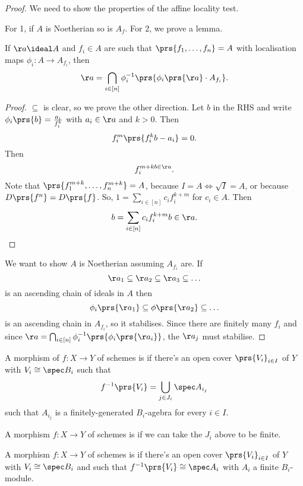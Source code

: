 \documentclass[10pt,a4paper,twoside,openany,hidelinks]{book}
\begin{document}
\begin{proof}
We need to show the properties of the affine locality test.

For 1, if $A$ is Noetherian so is $A_f$.
For 2, we prove a lemma.
\begin{lemma}
If $\aa \ideal A$ and $f_i \in A$ are such that $\prs{f_1, \ldots, f_n} = A$ with localisation maps $\phi_i \colon A \to A_{f_i}$, then
$$\aa = \bigcap_{i \in [n]} \phi_i^{-1}\prs{\phi_i\prs{\aa} \cdot A_{f_i}} \text{.}$$
\end{lemma}
\begin{proof}
$\subseteq$ is clear, so we prove the other direction. Let $b$ in the RHS and write $\phi_i\prs{b} = \frac{a_i}{f_i^k}$ with $a_i \in \aa$ and $k > 0$.
Then
$$f_i^m\prs{f_i^k b - a_i} = 0 \text{.}$$
Then
$$f_i^{m+k b \in \aa} \text{.}$$
Note that $\prs{f_1^{m+k}, \ldots, f_n^{m+k}} = A$, because $I=A \iff \sqrt{I} = A$, or because $D\prs{f^n} = D\prs{f}$.
So, $1 = \sum_{i \in [n]}c_i f_i^{k+m}$ for $c_i \in A$.
Then $$b = \sum_{i \in [n]} c_i f_i^{k+m}b \in \aa \text{.}$$
\end{proof}

We want to show $A$ is Noetherian assuming $A_{f_i}$ are.
If $$\aa_1 \subseteq \aa_2 \subseteq \aa_3 \subseteq \ldots$$
is an ascending chain of ideals in $A$ then
$$\phi_i\prs{\aa_1} \subseteq \phi\prs{\aa_2} \subseteq \ldots$$
is an ascending chain in $A_{f_i}$, so it stabilises.
Since there are finitely many $f_i$ and since $\aa = \bigcap_{i \in [n]} \phi_i^{-1}\prs{\phi_i\prs{\aa_i}}$, the $\aa_j$ must stabilise.
\end{proof}

\begin{definition}
A morphism of $f \colon X \to Y$ of schemes is  if there's an open cover $\prs{V_i}_{i \in I}$ of $Y$ with $V_i \cong \spec B_i$ such that
$$f^{-1}\prs{V_i} = \bigcup_{j \in J_i} \spec A_{i_j}$$
such that $A_{i_j}$ is a finitely-generated $B_i$-agebra for every $i \in I$.
\end{definition}

\begin{definition}
A morphism $f \colon X \to Y$ of schemes is  if we can take the $J_i$ above to be finite.
\end{definition}

\begin{definition}
A morphism $f \colon X \to Y$ of schemes is  if there's an open cover $\prs{V_i}_{i \in I}$ of $Y$ with $V_i \cong \spec B_i$ and such that $f^{-1}\prs{V_i} \cong \spec A_i$ with $A_i$ a finite $B_i$-module.
\end{definition}
\end{document}

